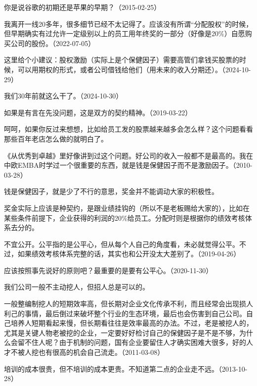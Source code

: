 你是说谷歌的初期还是苹果的早期？（2015-02-25）


我离开一线20多年，很多细节已经不太记得了。应该没有所谓“分配股权”的时候，但早期确实有过允许一定级别以上的员工用年终奖的一部分（好像是20\%）自愿购买公司的股份。（2022-07-05）

这里给个小建议：股权激励（实际上是个保健因子）需要高管们拿钱买股票的时候，可以用期权的形式，或者公司借钱给他们（用未来的收入分期还）。（2024-10-29）

我们30年前就这么干了。（2024-10-30）


如果是有言在先没问题，这是双方的契约精神。（2019-03-22）


呵呵，如果你反过来想想，比如给员工发的股票越来越多会怎么样？这个问题看看那些百年老店怎么做的就明白了。

《从优秀到卓越》里好像讲到过这个问题。好公司的收入一般都不是最高的。我在中欧EMBA时学过一个很重要的东西，就是钱是保健因子而不是激励因子。（2010-03-28）


钱是保健因子，就是少了不行的意思，奖金并不能调动大家的积极性。

奖金实际上应该是种契约，是跟业绩挂钩的（所以不是老板赐给大家的），比如在某些条件前提下，企业获得的利润的20\%给员工。分配时则是根据你的绩效考核体系去分的。

不宜公开。公平指的是公平心，但从每个人自己的角度看，未必就觉得公平。不过，如果绩效考核体系完整的话，其实也和公开没太大差别了。（2019-04-26）


应该按照事先说好的原则吧？最重要的是要有公平心。（2020-11-30）


我们公司一般不主动挖人，但招人总是可以的。

一般整编制挖人的短期效率高，但长期对企业文化传承不利，而且经常会出现损人利己的事情，最后倒过来破坏整个行业的生态环境，最后也会伤害到自己公司。自己培养人短期看起来慢，但长期看往往是效率最高的办法。不过，老是被挖人的，尤其是关键人物老被挖的企业，一定要好好检讨自己的保健因子是不是不够，为什么会留不住人呢？由于机制的问题，国有企业要留住人才确实困难大很多，好的人才不被人挖也有很高的机会自己流走。（2011-03-08）


培训的成本很贵，但不培训的成本更贵。不知道第二点的企业走不远。（2013-10-28）
